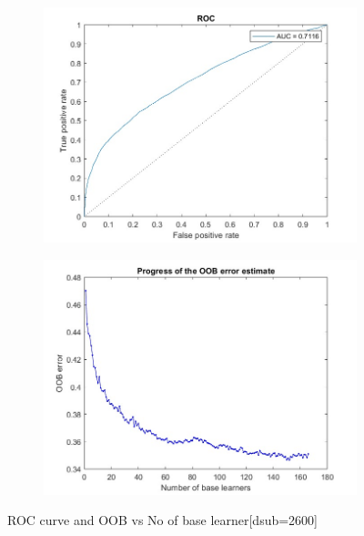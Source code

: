 \begin{figure}[H]
    \begin{subfigure}[b]{0.5\textwidth}
        \includegraphics[width=\textwidth]{img/2600/roc2600.jpg}
    \end{subfigure}
    \hfill
    \begin{subfigure}[b]{0.5\textwidth}
        \includegraphics[width=\textwidth]{img/2600/staturAATE2600.jpg}
    \end{subfigure}
    \caption{ROC curve and OOB vs No of base learner[dsub=2600]}
\end{figure}
